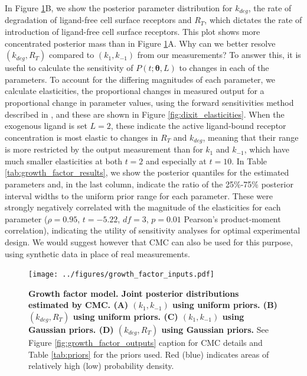 In Figure \ref{fig:growth_factor_inputs}B, we show the posterior parameter distribution for $k_{deg}$, the rate of degradation of ligand-free cell surface receptors and $R_T$, which dictates the rate of introduction of ligand-free cell surface receptors. This plot shows more concentrated posterior mass than in Figure \ref{fig:growth_factor_inputs}A. Why can we better resolve $(k_{deg},R_T)$ compared to $(k_1,k_{-1})$ from our measurements? To answer this, it is useful to calculate the sensitivity of $P(t; \boldsymbol{\theta}, L)$ to changes in each of the parameters. To account for the differing magnitudes of each parameter, we calculate elasticities, the proportional changes in measured output for a proportional change in parameter values, using the forward sensitivities method described in \cite{DGCT2018}, and these are shown in Figure \ref{fig:dixit_elasticities}. When the exogenous ligand is set $L=2$, these indicate the active ligand-bound receptor concentration is most elastic to changes in $R_T$ and $k_{deg}$, meaning that their range is more restricted by the output measurement than for $k_1$ and $k_{-1}$, which have much smaller elasticities at both $t=2$ and especially at $t=10$. In Table \ref{tab:growth_factor_results}, we show the posterior quantiles for the estimated parameters and, in the last column, indicate the ratio of the 25\%-75\% posterior interval widths to the uniform prior range for each parameter. These were strongly negatively correlated with the magnitude of the elasticities for each parameter ($\rho=0.95$, $t=-5.22$, $df=3$, $p=0.01$ Pearson's product-moment correlation), indicating the utility of sensitivity analyses for optimal experimental design. We would suggest however that CMC can also be used for this purpose, using synthetic data in place of real measurements.


\begin{figure}[H]
	\centerline{\texttt{[image: ../figures/growth\_factor\_inputs.pdf]}}
	\caption{\textbf{Growth factor model. Joint posterior distributions estimated by CMC. (A) $(k_1,k_{-1})$ using uniform priors. (B) $(k_{deg},R_T)$ using uniform priors. (C) $(k_1,k_{-1})$ using Gaussian priors. (D) $(k_{deg},R_T)$ using Gaussian priors.} See Figure \ref{fig:growth_factor_outputs} caption for CMC details and Table \ref{tab:priors} for the priors used. Red (blue) indicates areas of relatively high (low) probability density.}
	\label{fig:growth_factor_inputs}
\end{figure}

